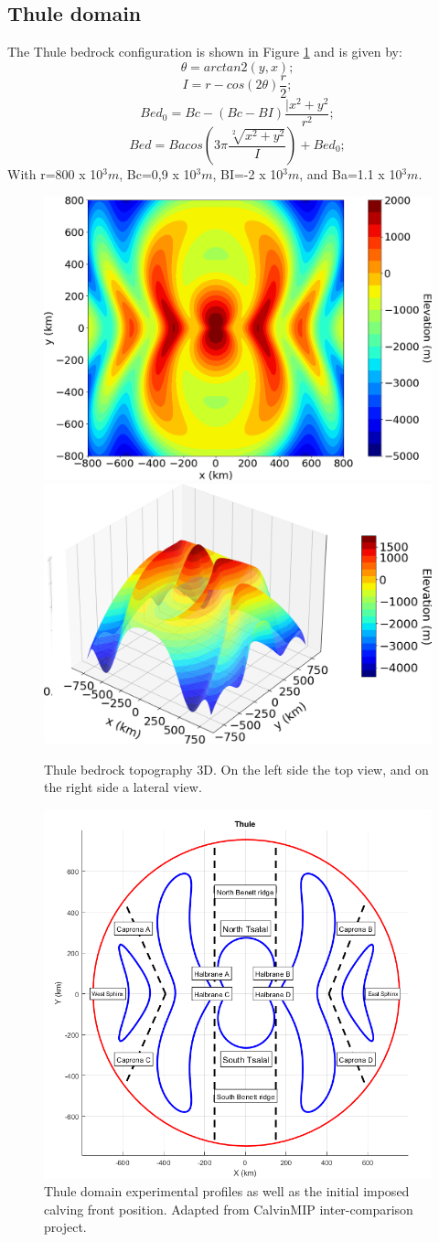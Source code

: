 \documentclass{article}
\begin{document}
\subsection{Thule domain}
The Thule bedrock configuration is shown in Figure \ref{Thule_3D} and is given by:
\begin{equation}
	\theta=arctan2(y,x);
\end{equation}
\begin{equation}
	I=r-cos(2\theta)\frac{r}{2};
\end{equation}
\begin{equation}
	Bed_0=Bc-(Bc-BI)\frac{|x^2+y^2}{r^2};
\end{equation}
\begin{equation}
	Bed=Bacos(3\pi\frac{\sqrt[2]{x^2+y^2}}{I})+Bed_0;
\end{equation}
With r=800 x 10$^3 m$, Bc=0,9 x 10$^3 m$, BI=-2 x 10$^3 m$, and Ba=1.1 x 10$^3 m$.
\begin{figure}[!h]
	\centering
	\includegraphics[width=0.45\linewidth]{../fig/Thule_2D}
	\includegraphics[width=0.45\linewidth]{../fig/Thule_3D}
	\caption{Thule bedrock topography 3D. On the left side the top view, and on the right side a lateral view.}
	\label{Thule_3D}
\end{figure}
\begin{figure}[!h]
	\centering
	\includegraphics[width=0.7\linewidth]{../fig/thule.png}
	\caption{Thule domain experimental profiles as well as the initial imposed calving front position. Adapted from CalvinMIP inter-comparison project.}
	\label{thule_profile}
\end{figure}
\end{document}
